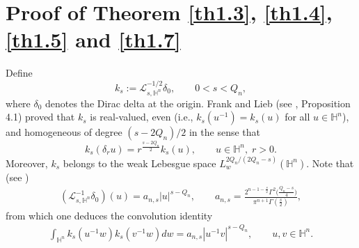 \documentclass[12pt,reqno]{amsart}%
\theoremstyle{plain}
\numberwithin{equation}{section}
\begin{document}
\section{Proof of Theorem \ref{th1.3}, \ref{th1.4}, \ref{th1.5} and \ref{th1.7}}

Define
\[
k_{s} := \mathcal{L}_{s,\mathbb{H}^{n}}^{-1/2}\delta_0, \qquad 0<s<Q_n,
\]
where \(\delta_0\) denotes the Dirac delta at the origin.
Frank and Lieb (see \cite{fl2}, Proposition 4.1) proved that \(k_s\) is real-valued, even (i.e., \(k_s(u^{-1})=k_s(u)\) for all \(u\in\mathbb{H}^n\)), and homogeneous of degree \((s-2Q_n)/2\) in the sense that
\[
k_s(\delta_r u) = r^{\frac{s-2Q_n}{2}} k_s(u), \qquad u\in\mathbb{H}^n,\; r>0.
\]
Moreover, \(k_s\) belongs to the weak Lebesgue space \(L^{2Q_n/(2Q_n-s)}_w(\mathbb{H}^n)\).
Note that (see \cite{Co,ron1})
\begin{align}\label{3.1}
(\mathcal{L}_{s,\mathbb{H}^{n}}^{-1}\delta_0)(u) = a_{n,s} |u|^{s-Q_n}, \qquad
a_{n,s} = \frac{2^{n-1-\frac{s}{2}}\Gamma^2\bigl(\frac{Q_n-s}{4}\bigr)}{\pi^{n+1}\Gamma(\frac{s}{2})},
\end{align}
from which one deduces the convolution identity
\begin{align}\label{3.2}
\int_{\mathbb{H}^n} k_s(u^{-1}w)k_s(v^{-1}w)dw = a_{n,s}|u^{-1}v|^{s-Q_n}, \qquad u,v\in\mathbb{H}^n.
\end{align}
\end{document}
